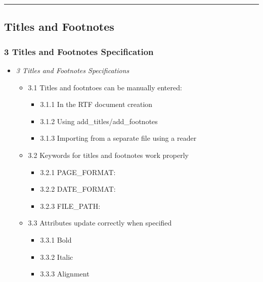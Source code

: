 \documentclass[]{article}
\providecommand{\tightlist}{%
  \setlength{\itemsep}{0pt}\setlength{\parskip}{0pt}}
\begin{document}
\begin{center}\rule{0.5\linewidth}{0.5pt}\end{center}

\hypertarget{titles-and-footnotes}{%
\subsection{Titles and Footnotes}\label{titles-and-footnotes}}

\hypertarget{titles-and-footnotes-specification}{%
\subsubsection{3 Titles and Footnotes
Specification}\label{titles-and-footnotes-specification}}

\begin{itemize}
\tightlist
\item
  \emph{3 Titles and Footnotes Specifications}

  \begin{itemize}
  \tightlist
  \item
    3.1 Titles and footntoes can be manually entered:

    \begin{itemize}
    \tightlist
    \item
      3.1.1 In the RTF document creation
    \item
      3.1.2 Using add\_titles/add\_footnotes
    \item
      3.1.3 Importing from a separate file using a reader
    \end{itemize}
  \item
    3.2 Keywords for titles and footnotes work properly

    \begin{itemize}
    \tightlist
    \item
      3.2.1 PAGE\_FORMAT:
    \item
      3.2.2 DATE\_FORMAT:
    \item
      3.2.3 FILE\_PATH:
    \end{itemize}
  \item
    3.3 Attributes update correctly when specified

    \begin{itemize}
    \tightlist
    \item
      3.3.1 Bold
    \item
      3.3.2 Italic
    \item
      3.3.3 Alignment


\end{itemize}
\end{itemize}
\end{itemize}
\end{document}
